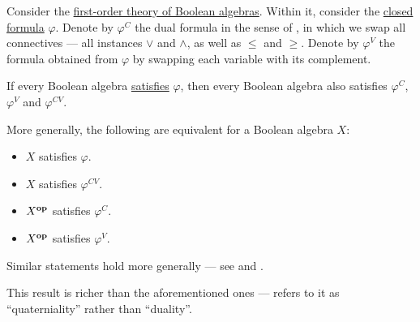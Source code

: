 \begin{theorem}\label{thm:boolean_algebra_duality}
  Consider the \hyperref[def:lattice/theory]{first-order theory of Boolean algebras}. Within it, consider the \hyperref[def:first_order_syntax/closed_formula]{closed formula} \( \varphi \). Denote by \( \varphi^C \) the dual formula in the sense of , in which we swap all connectives --- all instances \( \vee \) and \( \wedge \), as well as \( \leq \) and \( \geq \). Denote by \( \varphi^V \) the formula obtained from \( \varphi \) by swapping each variable with its complement.

  If every Boolean algebra \hyperref[def:first_order_model]{satisfies} \( \varphi \), then every Boolean algebra also satisfies \( \varphi^C \), \( \varphi^V \) and \( \varphi^{CV} \).

  More generally, the following are equivalent for a Boolean algebra \( X \):
  \begin{paracol}{2}
    \begin{leftcolumn}
      \begin{itemize}
        \item \( X \) satisfies \( \varphi \).
        \item \( X \) satisfies \( \varphi^{CV} \).
      \end{itemize}
    \end{leftcolumn}

    \begin{rightcolumn}
      \begin{itemize}
        \item \( X^\oppos \) satisfies \( \varphi^C \).
        \item \( X^\oppos \) satisfies \( \varphi^V \).
      \end{itemize}
    \end{rightcolumn}
  \end{paracol}
\end{theorem}
\begin{comments}
  \item Similar statements hold more generally --- see  and .

  \item This result is richer than the aforementioned ones ---  refers to it as \enquote{quaterniality} rather than \enquote{duality}.
\end{comments}

